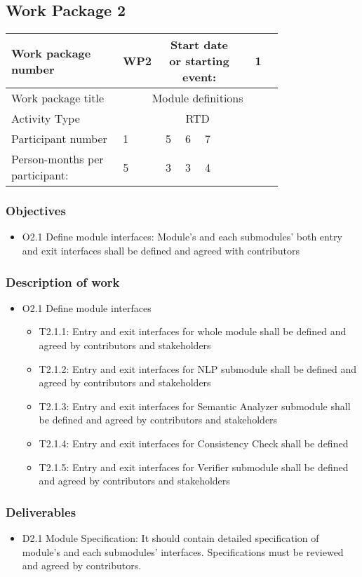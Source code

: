 \subsection{Work Package 2}

\begin{table}[hbpt]\centering
	\begin{tabular}{|p{0.35\linewidth}|p{0.06\linewidth}|p{0.06\linewidth}|p{0.06\linewidth}|
         p{0.06\linewidth}|p{0.06\linewidth}|p{0.06\linewidth}|p{0.06\linewidth}|}\hline
		 Work package number& WP2 &
		 \multicolumn{4}{|c|}{Start date or starting event:}{}&
		 \multicolumn{2}{|c|}{                        1 }{}\\\hline
		 Work package title&\multicolumn{7}{|c|}{Module definitions}{}\\\hline
		 Activity Type&\multicolumn{7}{|c|}{ RTD }{}\\\hline
		 Participant number & 1 & 5 & 6 & 7 & ~ & ~ & ~ \\\hline
		 Person-months per participant: & 5 & 3 & 3 & 4 & ~ & ~ & ~ \\\hline
	\end{tabular}
\end{table}

\subsubsection{Objectives}
\begin{itemize}
	\item O2.1 Define module interfaces: Module's and each submodules' both entry and exit interfaces shall be defined and agreed with contributors
\end{itemize}

\subsubsection{Description of work}
\begin{itemize}
	\item O2.1 Define module interfaces
	\begin{itemize}
		\item T2.1.1: Entry and exit interfaces for whole module shall be defined and agreed by contributors and stakeholders
		\item T2.1.2:  Entry and exit interfaces for \gls{NLP} submodule shall be defined and agreed by contributors and stakeholders
		\item T2.1.3:  Entry and exit interfaces for Semantic Analyzer submodule shall be defined and agreed by contributors and stakeholders
		\item T2.1.4:  Entry and exit interfaces for Consistency Check shall be defined
		\item T2.1.5:  Entry and exit interfaces for Verifier submodule shall be defined and agreed by contributors and stakeholders
	\end{itemize}
\end{itemize}

\subsubsection{Deliverables}
	\begin{itemize}
		\item D2.1 Module Specification: It should contain detailed specification of module's and each submodules' interfaces. Specifications must be reviewed and agreed by contributors.
	\end{itemize}